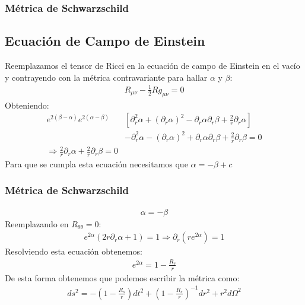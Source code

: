 \documentclass{beamer}
\begin{document}
\begin{frame}
\frametitle{Métrica de Schwarzschild}
\subsection{Ecuación de Campo de Einstein}

Reemplazamos el tensor de Ricci en la ecuación de campo de Einstein en el vacío y contrayendo con la métrica contravariante para hallar $ \alpha  $ y $ \beta  $: 
\begin{gather*}
  R _{\mu \nu }  - \frac{1}{2} R g _{\mu \nu }  = 0  
\end{gather*}
Obteniendo: 
\begin{align*}
  e ^ {2 (\beta - \alpha )} e ^ {2 (\alpha - \beta )} &\left[\partial_r^2 \alpha + (\partial_r \alpha )^2 - \partial_r \alpha \partial_r \beta + \frac{2 }{r } \partial_r \alpha \right] \\ 
  &- \partial_r^2 \alpha - (\partial_r \alpha)^2 + \partial_r \alpha \partial_r \beta + \frac{2}{r} \partial_r \beta = 0 \\ 
  \Longrightarrow \frac{2 }{r } \partial_r \alpha + \frac{2 }{r } \partial_r \beta = 0 
\end{align*}
Para que se cumpla esta ecuación necesitamos que $ \alpha = - \beta + c  $
\end{frame}




\begin{frame}
\frametitle{Métrica de Schwarzschild}

\begin{gather*}
  \alpha = - \beta  
\end{gather*}
Reemplazando en $ R _{\theta \theta }  = 0  $: 
\begin{gather*}
  e ^ {2\alpha }(2r \partial_r \alpha + 1 ) = 1 \Longrightarrow \partial_r (r e ^ {2\alpha }) = 1 
\end{gather*}
Resolviendo esta ecuación obtenemos: 
\begin{gather*}
  e ^ {2\alpha } = 1 - \frac{R_s }{r } 
\end{gather*}
De esta forma obtenemos que podemos escribir la métrica como: 
\begin{gather*}
  ds^2 = - \left(1 - \frac{R_s }{r }\right)dt^2 + \left(1 - \frac{R_s }{r}\right) ^ {-1 } dr^2 + r^2 d \Omega^2  
\end{gather*}
\end{frame}
\end{document}
